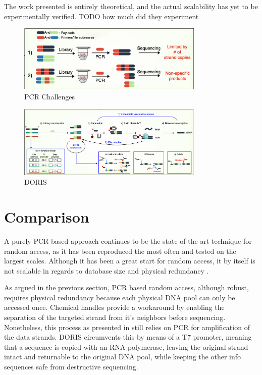 \documentclass[a4paper,conference]{IEEEtran}
\begin{document}
The work presented is entirely theoretical, and the actual scalability has yet to be experimentally verified. TODO how much did they experiment

\begin{figure}[!t]
\centering
\includegraphics[width=3.5in]{pcrchallenges}
\caption{PCR Challenges}
\label{pcr_challenges}
\end{figure}

\begin{figure}[!t]
\centering
\includegraphics[width=3.5in]{doris}
\caption{DORIS}
\label{doris}
\end{figure}

\section{Comparison}
A purely PCR based approach continues to be the state-of-the-art technique for random access, as it has been reproduced the most often and tested on the largest scales. Although it has been a great start for random access, it by itself is not scalable in regards to database size and physical redundancy \cite{}. 

As argued in the previous section, PCR based random access, although robust, requires physical redundancy because each physical DNA pool can only be accessed once. Chemical handles provide a workaround by enabling the separation of the targeted strand from it's neighbors before sequencing. Nonetheless, this process as presented in \cite{} still relies on PCR for amplification of the data strands. DORIS circumvents this by means of a T7 promoter, meaning that a sequence is copied with an RNA polymerase, leaving the original strand intact and returnable to the original DNA pool, while keeping the other info sequences safe from destructive sequencing.
\end{document}
